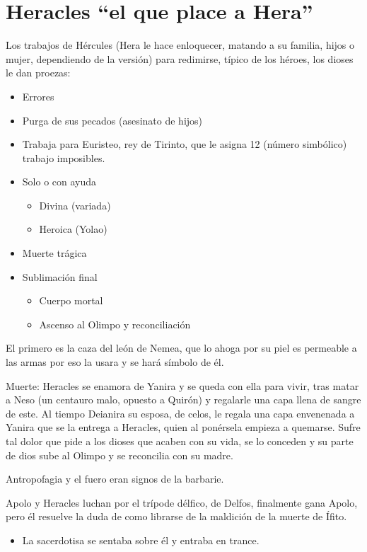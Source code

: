 \section{Heracles \enquote{el que place a Hera}}
Los trabajos de Hércules (Hera le hace enloquecer, matando a su familia, hijos o mujer, dependiendo de la versión) para redimirse, típico de los héroes, los dioses le dan proezas:
\begin{itemize}
	\item Errores
	\item Purga de sus pecados (asesinato de hijos)
	\item Trabaja para Euristeo, rey de Tirinto, que le asigna 12 (número simbólico) trabajo imposibles.
	\item Solo o con ayuda
	      \begin{itemize}
		      \item Divina (variada)
		      \item Heroica (Yolao)
	      \end{itemize}
	\item Muerte trágica
	\item Sublimación final
	      \begin{itemize}
		      \item Cuerpo mortal
		      \item Ascenso al Olimpo y reconciliación
	      \end{itemize}
\end{itemize}
El primero es la caza del león de Nemea, que lo ahoga por su piel es permeable a las armas por eso la usara y se hará símbolo de él.

Muerte: Heracles se enamora de Yanira y se queda con ella para vivir, tras matar a Neso (un centauro malo, opuesto a Quirón) y regalarle una capa llena de sangre de este. Al tiempo Deianira su esposa, de celos, le regala una capa envenenada a Yanira que se la entrega a Heracles, quien al ponérsela empieza a quemarse. Sufre tal dolor que pide a los dioses que acaben con su vida, se lo conceden y su parte de dios sube al Olimpo y se reconcilia con su madre.

Antropofagia y el fuero eran signos de la barbarie.

Apolo y Heracles luchan por el trípode délfico, de Delfos, finalmente gana Apolo, pero él resuelve la duda de como librarse de la maldición de la muerte de Ífito.
\begin{itemize}
	\item La sacerdotisa se sentaba sobre él y entraba en trance.
\end{itemize}

